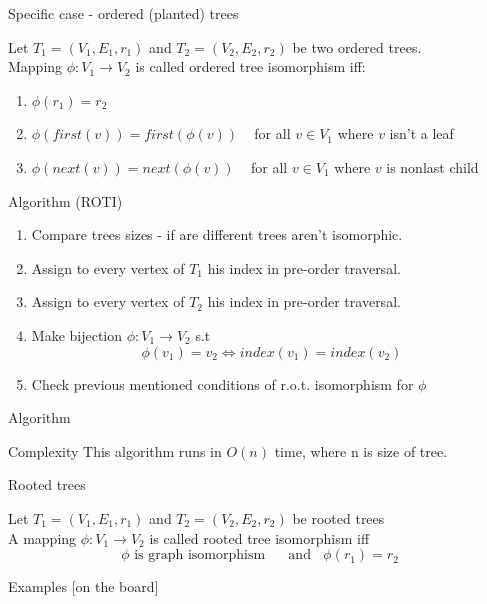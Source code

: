 \documentclass{beamer}
\begin{document}
\begin{frame}{Specific case - ordered (planted) trees}

\begin{definition}
\end{definition}
\begin{definition}
\small
Let $T_1 = (V_1,E_1, r_1)$ and $T_2 = (V_2,E_2, r_2) $ be two ordered trees. \\
Mapping $\phi : V_1 \rightarrow V_2$ is called \alert{ordered tree isomorphism} iff:
\begin{enumerate}
\item $\phi(r_1) = r_2$
\item $\phi(first(v)) = first(\phi(v))$ ~ for all $v \in V_1$ where $v$ isn't a leaf
\item $\phi(next(v)) = next(\phi(v))$ ~ for all $v \in V_1$ where $v$ is nonlast child 
\end{enumerate}
\end{definition}
\end{frame}



\begin{frame}{Algorithm (ROTI)}
	\begin{enumerate}
    \item Compare trees sizes - if are different trees aren't isomorphic.
	\item Assign to every vertex of $T_1$ his index in pre-order traversal.
    \item Assign to every vertex of $T_2$ his index in pre-order traversal.
    \item Make bijection $\phi : V_1 \rightarrow V_2$ s.t $$\phi(v_1) = v_2  \iff index(v_1) = index(v_2)$$
    \item Check previous mentioned conditions of r.o.t. isomorphism for $\phi$ 
    \end{enumerate}
\end{frame}

\begin{frame}{Algorithm}
\begin{block}{Complexity}
	This algorithm runs in $O(n)$ time, where n is size of tree.
\end{block}
\end{frame}


\begin{frame}{Rooted trees}
\begin{definition}
Let $T_1 = (V_1, E_1, r_1)$ and $T_2 = (V_2, E_2, r_2)$ be rooted trees  \\
	A mapping $\phi : V_1 \rightarrow V_2$ is called \alert{rooted tree isomorphism} iff $$\phi \text{ is graph isomorphism ~~~~and} ~~~~ \phi(r_1) = r_2$$
\end{definition}
\begin{block}{Examples}
[on the board]
\end{block}

\end{frame}
\end{document}

